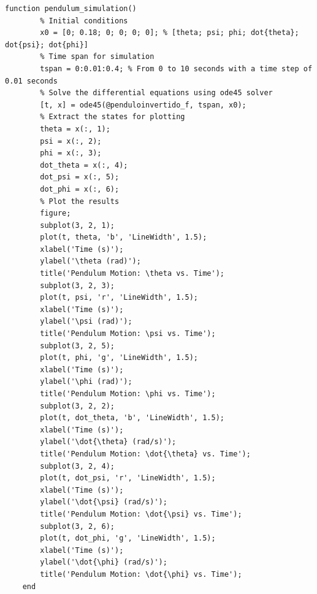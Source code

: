 \documentclass[10pt]{article}
\begin{document}
\begin{appendices}
\begin{lstlisting}[caption={Código da simulação do sistema com ode45}, label=lst:pendulum_sim_l]
    function pendulum_simulation()
        % Initial conditions
        x0 = [0; 0.18; 0; 0; 0; 0]; % [theta; psi; phi; dot{theta}; dot{psi}; dot{phi}]
        % Time span for simulation
        tspan = 0:0.01:0.4; % From 0 to 10 seconds with a time step of 0.01 seconds
        % Solve the differential equations using ode45 solver
        [t, x] = ode45(@penduloinvertido_f, tspan, x0);
        % Extract the states for plotting
        theta = x(:, 1);
        psi = x(:, 2);
        phi = x(:, 3);
        dot_theta = x(:, 4);
        dot_psi = x(:, 5);
        dot_phi = x(:, 6);
        % Plot the results
        figure;
        subplot(3, 2, 1);
        plot(t, theta, 'b', 'LineWidth', 1.5);
        xlabel('Time (s)');
        ylabel('\theta (rad)');
        title('Pendulum Motion: \theta vs. Time');
        subplot(3, 2, 3);
        plot(t, psi, 'r', 'LineWidth', 1.5);
        xlabel('Time (s)');
        ylabel('\psi (rad)');
        title('Pendulum Motion: \psi vs. Time');
        subplot(3, 2, 5);
        plot(t, phi, 'g', 'LineWidth', 1.5);
        xlabel('Time (s)');
        ylabel('\phi (rad)');
        title('Pendulum Motion: \phi vs. Time');
        subplot(3, 2, 2);
        plot(t, dot_theta, 'b', 'LineWidth', 1.5);
        xlabel('Time (s)');
        ylabel('\dot{\theta} (rad/s)');
        title('Pendulum Motion: \dot{\theta} vs. Time');
        subplot(3, 2, 4);
        plot(t, dot_psi, 'r', 'LineWidth', 1.5);
        xlabel('Time (s)');
        ylabel('\dot{\psi} (rad/s)');
        title('Pendulum Motion: \dot{\psi} vs. Time');
        subplot(3, 2, 6);
        plot(t, dot_phi, 'g', 'LineWidth', 1.5);
        xlabel('Time (s)');
        ylabel('\dot{\phi} (rad/s)');
        title('Pendulum Motion: \dot{\phi} vs. Time');
    end


\end{lstlisting}
\end{appendices}
\end{document}
